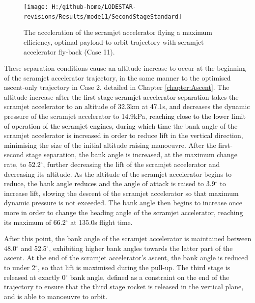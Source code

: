   \begin{figure}[!ht] %
  	\centering
  	\texttt{[image: H:/github-home/LODESTAR-revisions/Results/mode11/SecondStageStandard]}
  	\caption{The acceleration of the scramjet accelerator flying a maximum efficiency, optimal payload-to-orbit trajectory with scramjet accelerator fly-back (Case 11). }
  	\label{fig:SecondStageStandard}
  \end{figure}
  These separation conditions cause an altitude increase to occur at the beginning of the scramjet accelerator trajectory, in the same manner to the optimised ascent-only trajectory in Case 2, detailed in Chapter \ref{chapter:Ascent}.
The altitude increase \textcolor{black}{after the first stage-scramjet accelerator separation} takes the scramjet accelerator to an altitude of \textcolor{black}{32.3}km at \textcolor{black}{47.1}s, and decreases the dynamic pressure of the scramjet accelerator to \textcolor{black}{14.9}kPa, \textcolor{black}{reaching close to the lower limit of operation of the scramjet engines,} \textcolor{black}{during which time} the bank angle of the scramjet accelerator is increased in order to reduce lift in the vertical direction, minimising the size of the initial altitude raising manoeuvre. 
 After the first-second stage separation, the bank angle is increased, at the maximum change rate, to \textcolor{black}{52.2}$^\circ$, further decreasing the lift of the scramjet accelerator and decreasing its altitude. As the altitude of the scramjet accelerator begins to reduce, the bank angle \textcolor{black}{reduces} and the angle of attack is raised to \textcolor{black}{3.9}$^\circ$ to increase lift, slowing the descent of the scramjet accelerator so that maximum dynamic pressure is not exceeded. 
 The bank angle then begins to increase once more in order to change the heading angle of the scramjet accelerator, reaching its maximum of \textcolor{black}{66.2}$^\circ$ at 135.0s flight time. 

After this point, the bank angle of the scramjet accelerator is maintained between \textcolor{black}{48.0}$^\circ$ and \textcolor{black}{52.5}$^\circ$, exhibiting higher bank angles towards the latter part of the ascent. At the end of the scramjet accelerator's ascent, the bank angle is reduced to under 2$^\circ$, so that lift is maximised during the pull-up. The third stage is released at exactly 0$^\circ$ bank angle, defined as a constraint on the end of the trajectory to ensure that the third stage rocket is released in the vertical plane, and is able to manoeuvre to orbit. 


